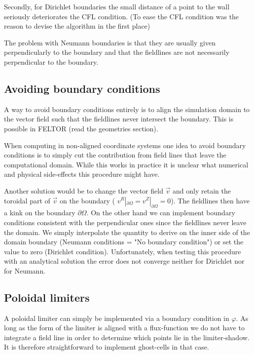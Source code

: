 Secondly, for Dirichlet boundaries the small 
distance of a point to the wall seriously deteriorates the CFL condition. (To ease the CFL condition 
was the reason to devise the algorithm in the first place)

The problem with Neumann boundaries is that they are usually given 
perpendicularly to the boundary and that the fieldlines are not necessarily
perpendicular to the boundary. 

\subsection{Avoiding boundary conditions}
A way to avoid boundary conditions entirely is to
align the simulation domain to the vector field such that the fieldlines
never intersect the boundary. This is possible in FELTOR (read the
geometries section).

When computing in non-aligned coordinate systems
one idea to avoid boundary conditions
is to simply cut the contribution from field lines
that leave the computational domain. While this works in practice
it is unclear what numerical and physical side-effects this procedure might have.

Another solution would be to change the 
vector field $\vec v$ and only retain the toroidal part of $\vec v$ on the 
boundary ( $v^R|_{\partial\Omega} = v^Z|_{\partial\Omega} =0$). The fieldlines then have a kink on the boundary $\partial\Omega$. 
On the other hand we can implement boundary conditions consistent with 
the perpendicular ones since the fieldlines never leave the domain. 
We simply interpolate the quantity to derive on the inner side of the
domain boundary (Neumann conditions = "No boundary condition") or 
set the value to zero (Dirichlet condition).
Unfortunately, when testing this procedure with an analytical solution
the error does not converge neither for Dirichlet nor for Neumann.

\subsection{Poloidal limiters}
A poloidal limiter can simply be implemented via a boundary condition in $\varphi$. 
As long as the form of the limiter is aligned with a flux-function we do not have to 
integrate a field line in order to determine which points lie in the
limiter-shadow. It is therefore straightforward to implement ghost-cells 
in that case. 


